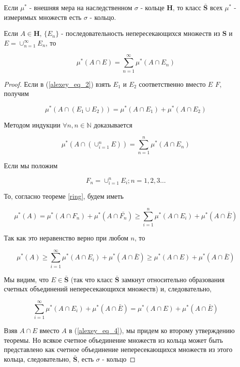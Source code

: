 
\begin{theorem_sub}
\cite{HalmoshTheoryM1953}
\label{sigma-ring}
Если  $\mu^{*}$ - внешняя мера на наследственном $\sigma$ - кольце $\textbf{H}$, то класс $\bar{\textbf{S}}$ всех $\mu^{*}$ - измеримых множеств есть $\sigma$ - кольцо. 

Если $A \in \textbf{H}$, $\{E_n\}$ - последовательность непересекающихся множеств из $\textbf{S}$ и $E = \cup_{n = 1}^{\infty}E_n$, то

$$
	\mu^{*} (A \cap E) = \sum_{n = 1}^{\infty}\mu^{*}(A \cap E_n)
$$

\end{theorem_sub}

\begin{proof}

Если в (\ref{alexey_eq_2}) взять  $E_1$ и $E_2$ соответственно вместо $E$ $F$, получим


$$
	\mu^{*}(A \cap (E_1 \cup E_2)) = \mu^{*}(A \cap E_1) + \mu^{*}(A \cap E_2)
$$

Методом индукции $\forall n, n \in \mathds{N}$ доказывается

$$
	\mu^{*}(A \cap (\cup_{i = 1}^{n}E)) = \sum_{n = 1}^{n}\mu^{*}(A \cap E_n)
$$
 
Если мы положим 

$$
	F_n = \cup_{i = 1}^{n}E_i; n = 1, 2, 3 ...
$$

То, согласно теореме \ref{ring}, будем иметь
 
 $$
 	\mu^{*}(A) = \mu^{*}(A \cap F_n) + \mu^{*}(A \cap \bar{F_n}) \geq \sum_{i = 1}^{n}\mu^{*}(A \cap E_i) + \mu^{*}(A \cap \bar{E})
 $$
 
Так как это неравенство верно при любом  $n$, то
 
$$
 	\mu^{*}(A) \geq \sum_{i = 1}^{\infty}\mu^{*}(A \cap E_i) + \mu^{*}(A \cap \bar{E}) \geq \mu^{*}(A \cap E) + \mu^{*}(A \cap \bar{E})
$$

Мы видим, что $E \in \bar{\textbf{S}}$  (так что класс $\bar{\textbf{S}}$ замкнут относительно образования счетных объединений непересекающихся множеств) и, следовательно,

\begin{equation}\label{alexey_eq_4}
	\sum_{i = 1}^{\infty}\mu^{*}(A \cap E_i) + \mu^{*}(A \cap \bar{E}) = \mu^{*}(A \cap E) + \mu^{*}(A \cap \bar{E})
\end{equation}

Взяв $A \cap E$ вместо $A$ в (\ref{alexey_eq_4}), мы придем ко второму утверждению теоремы. Но всякое счетное объединение множеств из кольца может быть представлено как счетное объединение непересекающихся множеств из этого кольца, следовательно, $\bar{\textbf{S}}$, есть $\sigma$ - кольцо
\end{proof}

